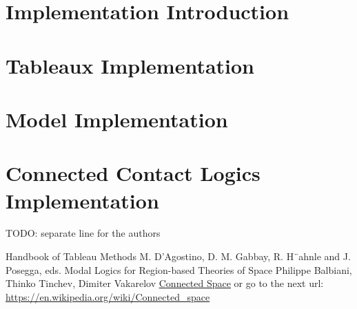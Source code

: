 \documentclass{article}
\begin{document}
	\newpage
	\section{Implementation Introduction}

	\newpage
	\section{Tableaux Implementation}

	\newpage
	\section{Model Implementation}

	\newpage
	\section{Connected Contact Logics Implementation}

	\newpage
	TODO: separate line for the authors
	\begin{thebibliography}{9}
			Handbook of Tableau Methods
			M. D’Agostino, D. M. Gabbay, R. H¨ahnle and J. Posegga, eds.
			Modal Logics for Region-based Theories of Space
			Philippe Balbiani, Thinko Tinchev, Dimiter Vakarelov
			\href{https://en.wikipedia.org/wiki/Connected_space}{Connected Space}
			or go to the next url: \url{https://en.wikipedia.org/wiki/Connected_space}
	\end{thebibliography}
\end{document}
